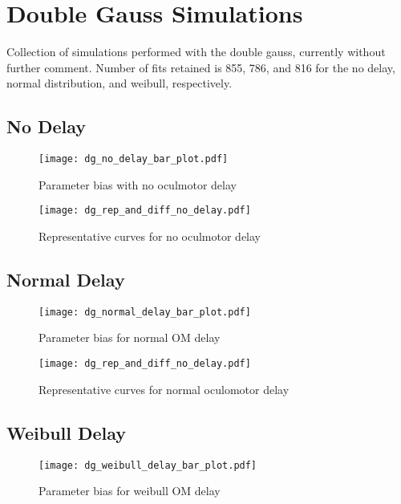 \section{Double Gauss Simulations}

Collection of simulations performed with the double gauss, currently without further comment. Number of fits retained is 855, 786, and 816 for the no delay, normal distribution, and weibull, respectively.

\subsection{No Delay}


\begin{figure}[H]
\centering
\texttt{[image: dg\_no\_delay\_bar\_plot.pdf]} 
\caption{Parameter bias with no oculmotor delay}
\label{fig:dg_par_bias_no_delay}
\end{figure}

\begin{figure}[H]
\centering
\texttt{[image: dg\_rep\_and\_diff\_no\_delay.pdf]}
\caption{Representative curves for no oculmotor delay}
\label{fig:dg_rep_curves_no_delay}
\end{figure}


\subsection{Normal Delay}


\begin{figure}[H]
\centering
\texttt{[image: dg\_normal\_delay\_bar\_plot.pdf]} 
\caption{Parameter bias for normal OM delay}
\label{fig:dg_par_bias_normal_delay}
\end{figure}

\begin{figure}[H]
\centering
\texttt{[image: dg\_rep\_and\_diff\_no\_delay.pdf]}
\caption{Representative curves for normal oculomotor delay}
\label{fig:dg_rep_curves_normal_delay}
\end{figure}

\subsection{Weibull Delay}

\begin{figure}[H]
\centering
\texttt{[image: dg\_weibull\_delay\_bar\_plot.pdf]} 
\caption{Parameter bias for weibull OM delay}
\label{fig:dg_par_bias_weibull_delay}
\end{figure}

